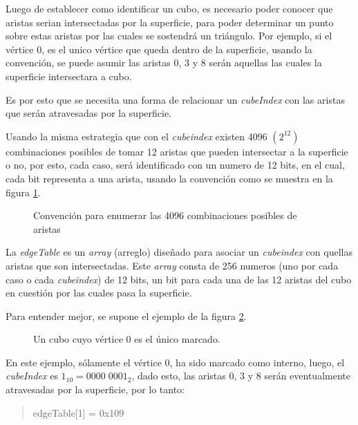 Luego de establecer como identificar un cubo, es necesario poder conocer que aristas serian intersectadas por la superficie, para poder determinar un punto sobre estas aristas por las cuales se sostendrá un triángulo. Por ejemplo, si el vértice $0$, es el unico vértice que queda dentro de la superficie, usando la convención, se puede asumir las aristas $0$, $3$ y $8$ serán aquellas las cuales la superficie intersectara a cubo.

Es por esto que se necesita una forma de relacionar un \emph{cubeIndex} con las aristas que serán atravesadas por la superficie.

Usando la misma estrategia que con el \emph{cubeindex} existen 4096 $(2^{12})$ combinaciones posibles de tomar 12 aristas que pueden intersectar a la superficie o no, por esto, cada caso, será identificado con un numero de 12 bits, en el cual, cada bit representa a una arista, usando la convención como se muestra en la figura \ref{f:ch:implementacion:sec:CubeIndex:edgeTable:edge_convention}.

\begin{figure}[hbt]
	\makebox[\textwidth]{\framebox[0.4\textwidth]{\rule{0pt}{0.3\textwidth}}}
	\caption{Convención para enumerar las 4096 combinaciones posibles de aristas}
	\label{f:ch:implementacion:sec:CubeIndex:edgeTable:edge_convention}
\end{figure}

La \emph{edgeTable} es un \emph{array} (arreglo) diseñado para asociar un \emph{cubeindex} con quellas aristas que son intersectadas. Este \emph{array} consta de 256 numeros (uno por cada caso o cada \emph{cubeindex}) de 12 bits, un bit para cada una de las 12 aristas del cubo en cuestión por las cuales pasa la superficie.

Para entender mejor, se supone el ejemplo de la figura \ref{f:ch:implementacion:sec:CubeIndex:edgeTable:example}.

\begin{figure}[hbt]
	\makebox[\textwidth]{\framebox[0.3\textwidth]{\rule{0pt}{0.2\textwidth}}}
	\caption{Un cubo cuyo vértice $0$ es el único marcado.}
	\label{f:ch:implementacion:sec:CubeIndex:edgeTable:example}
\end{figure}

En este ejemplo, sólamente el vértice $0$, ha sido marcado como interno, luego, el \emph{cubeIndex} es $1_{10} = 0000 \; 0001_{2}$, dado esto, las aristas $0$, $3$ y $8$ serán eventualmente atravesadas por la superficie, por lo tanto:

\begin{quote}
	edgeTable[1] = 0x109
\end{quote}

